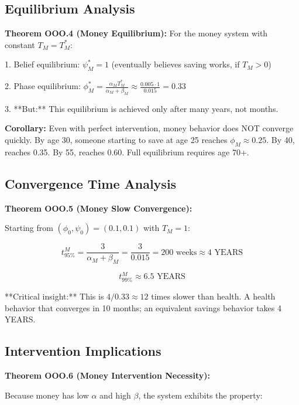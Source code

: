 \subsection{Equilibrium Analysis}

\textbf{Theorem OOO.4 (Money Equilibrium):} For the money system with constant $T_M = T^*_M$:

1. Belief equilibrium: $\psi^*_M = 1$ (eventually believes saving works, if $T_M > 0$)

2. Phase equilibrium: $\phi^*_M = \frac{\alpha_M T^*_M}{\alpha_M + \beta_M} \approx \frac{0.005 \cdot 1}{0.015} = 0.33$

3. **But:** This equilibrium is achieved only after many years, not months.

\textbf{Corollary:} Even with perfect intervention, money behavior does NOT converge quickly. By age 30, someone starting to save at age 25 reaches $\phi_M \approx 0.25$. By 40, reaches 0.35. By 55, reaches 0.60. Full equilibrium requires age 70+.

\subsection{Convergence Time Analysis}

\textbf{Theorem OOO.5 (Money Slow Convergence):}

Starting from $(\phi_0, \psi_0) = (0.1, 0.1)$ with $T_M = 1$:

\begin{equation}
t_{95\%}^M = \frac{3}{\alpha_M + \beta_M} = \frac{3}{0.015} = 200 \text{ weeks} \approx 4 \text{ YEARS}
\end{equation}

\begin{equation}
t_{99\%}^M \approx 6.5 \text{ YEARS}
\end{equation}

**Critical insight:** This is $4 / 0.33 \approx 12$ times slower than health. A health behavior that converges in 10 months; an equivalent savings behavior takes 4 YEARS.

\subsection{Intervention Implications}

\textbf{Theorem OOO.6 (Money Intervention Necessity):}

Because money has low $\alpha$ and high $\beta$, the system exhibits the property:

